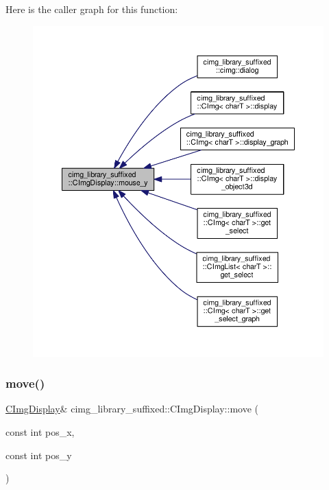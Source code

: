 Here is the caller graph for this function\+:
\nopagebreak
\begin{figure}[H]
\begin{center}
\leavevmode
\includegraphics[width=350pt]{d5/d53/structcimg__library__suffixed_1_1CImgDisplay_a1ffc2df4868b1ab0c3665e0b8175dd07_icgraph}
\end{center}
\end{figure}
\mbox{\label{structcimg__library__suffixed_1_1CImgDisplay_aba5d6f1e8a3f1d086ca4defe91aa94a6}} 
\subsubsection{\texorpdfstring{move()}{move()}}
{\footnotesize\ttfamily \hyperlink{structcimg__library__suffixed_1_1CImgDisplay}{C\+Img\+Display}\& cimg\+\_\+library\+\_\+suffixed\+::\+C\+Img\+Display\+::move (\begin{DoxyParamCaption}\item[{const int}]{pos\+\_\+x,  }\item[{const int}]{pos\+\_\+y }\end{DoxyParamCaption})\hspace{0.3cm}{\ttfamily [inline]}}



